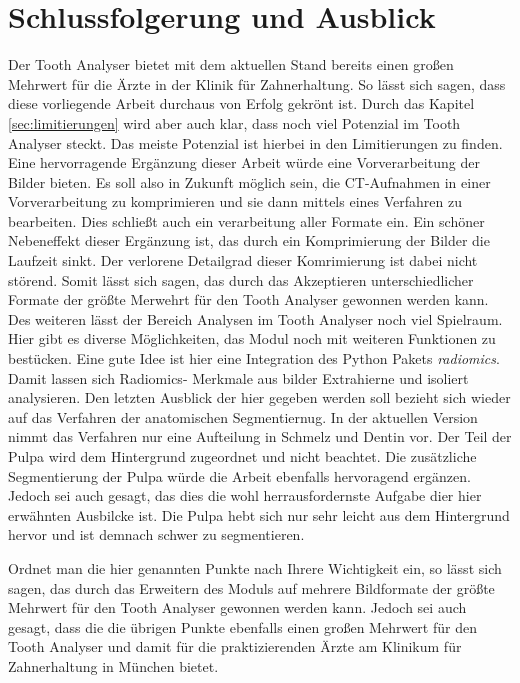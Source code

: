 \chapter{Schlussfolgerung und Ausblick}
\label{chap:schlussfolgerung} Der Tooth Analyser bietet mit dem aktuellen Stand bereits
einen großen Mehrwert für die Ärzte in der Klinik für Zahnerhaltung. So lässt
sich sagen, dass diese vorliegende Arbeit durchaus von Erfolg gekrönt ist. Durch
das Kapitel \ref{sec:limitierungen} wird aber auch klar, dass noch viel Potenzial
im Tooth Analyser steckt. Das meiste Potenzial ist hierbei in den Limitierungen
zu finden. Eine hervorragende Ergänzung dieser Arbeit würde eine Vorverarbeitung
der Bilder bieten. Es soll also in Zukunft möglich sein, die CT-Aufnahmen in einer
Vorverarbeitung zu komprimieren und sie dann mittels eines Verfahren zu bearbeiten.
Dies schließt auch ein verarbeitung aller Formate ein. Ein schöner Nebeneffekt dieser
Ergänzung ist, das durch ein Komprimierung der Bilder die Laufzeit sinkt. Der verlorene
Detailgrad dieser Komrimierung ist dabei nicht störend. Somit lässt sich sagen, das
durch das Akzeptieren unterschiedlicher Formate der größte Merwehrt für den Tooth
Analyser gewonnen werden kann. Des weiteren lässt der Bereich Analysen im Tooth
Analyser noch viel Spielraum. Hier gibt es diverse Möglichkeiten, das Modul noch
mit weiteren Funktionen zu bestücken. Eine gute Idee ist hier eine Integration des
Python Pakets \textit{radiomics}. Damit lassen sich Radiomics- Merkmale aus
bilder Extrahierne und isoliert analysieren. Den letzten Ausblick der hier gegeben
werden soll bezieht sich wieder auf das Verfahren der anatomischen Segmentiernug.
In der aktuellen Version nimmt das Verfahren nur eine Aufteilung in Schmelz und
Dentin vor. Der Teil der Pulpa wird dem Hintergrund zugeordnet und nicht beachtet.
Die zusätzliche Segmentierung der Pulpa würde die Arbeit ebenfalls hervoragend
ergänzen. Jedoch sei auch gesagt, das dies die wohl herrausfordernste Aufgabe
dier hier erwähnten Ausbilcke ist. Die Pulpa hebt sich nur sehr leicht aus dem Hintergrund
hervor und ist demnach schwer zu segmentieren.

Ordnet man die hier genannten Punkte nach Ihrere Wichtigkeit ein, so lässt sich
sagen, das durch das Erweitern des Moduls auf mehrere Bildformate der größte Mehrwert
für den Tooth Analyser gewonnen werden kann. Jedoch sei auch gesagt, dass die die
übrigen Punkte ebenfalls einen großen Mehrwert für den Tooth Analyser und damit für
die praktizierenden Ärzte am Klinikum für Zahnerhaltung in München bietet.
